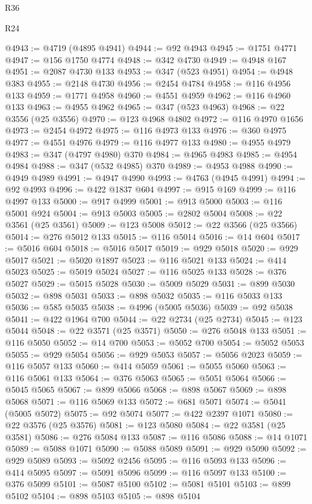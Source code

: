 \begin{lexlean}{R36}
\begin{lexlean}{R24}
\begin{coremodule}
{{{{{{{{{{{{{{{{{{{{{{{{{{{{{{{{{{{{{{{{{{{{{{{{{{{{{{{{{{{{{{{{{{{{{{{{{{{{{{{{{{{{{{{{{{{{{{{{{{{{{{{{{{{{{{{{{{{{{{{{{{{{{{{{{{{{{{{{{{{{{{{{{{{{{{{{{{{{{{{{{{{{{{{{{{{{{{{{{{{{{{{{{{{{{{{{{{{@4943 := @4719 (@4895 @4941)
@4944 := @92 @4943
@4945 := @1751 @4771
@4947 := @156 @1750 @4774
@4948 := @342 @4730
@4949 := @4948 @167
@4951 := @2087 @4730 @133
@4953 := @347 (@523 @4951)
@4954 := @4948 @383
@4955 := @2148 @4730
@4956 := @2454 @4784
@4958 := @116 @4956 @133
@4959 := @1771 @4958
@4960 := @4551 @4959
@4962 := @116 @4960 @133
@4963 := @4955 @4962
@4965 := @347 (@523 @4963)
@4968 := @22 @3556 (@25 @3556)
@4970 := @123 @4968 @4802
@4972 := @116 @4970 @1656
@4973 := @2454 @4972
@4975 := @116 @4973 @133
@4976 := @360 @4975
@4977 := @4551 @4976
@4979 := @116 @4977 @133
@4980 := @4955 @4979
@4983 := @347 (@4797 @4980) @370
@4984 := @4965 @4983
@4985 := @4954 @4984
@4988 := @347 (@532 @4985) @370
@4989 := @4953 @4988
@4990 := @4949 @4989
@4991 := @4947 @4990
@4993 := @4763 (@4945 @4991)
@4994 := @92 @4993
@4996 := @422 @1837 @604
@4997 := @915 @169
@4999 := @116 @4997 @133
@5000 := @917 @4999
@5001 := @913 @5000
@5003 := @116 @5001 @924
@5004 := @913 @5003
@5005 := @2802 @5004
@5008 := @22 @3561 (@25 @3561)
@5009 := @123 @5008
@5012 := @22 @3566 (@25 @3566)
@5014 := @276 @5012 @133
@5015 := @116 @5014
@5016 := @14 @604
@5017 := @5016 @604
@5018 := @5016 @5017
@5019 := @929 @5018
@5020 := @929 @5017
@5021 := @5020 @1897
@5023 := @116 @5021 @133
@5024 := @414 @5023
@5025 := @5019 @5024
@5027 := @116 @5025 @133
@5028 := @376 @5027
@5029 := @5015 @5028
@5030 := @5009 @5029
@5031 := @899 @5030
@5032 := @898 @5031
@5033 := @898 @5032
@5035 := @116 @5033 @133
@5036 := @585 @5035
@5038 := @4996 (@5005 @5036)
@5039 := @92 @5038
@5041 := @422 @1964 @700
@5044 := @22 @2734 (@25 @2734)
@5045 := @123 @5044
@5048 := @22 @3571 (@25 @3571)
@5050 := @276 @5048 @133
@5051 := @116 @5050
@5052 := @14 @700
@5053 := @5052 @700
@5054 := @5052 @5053
@5055 := @929 @5054
@5056 := @929 @5053
@5057 := @5056 @2023
@5059 := @116 @5057 @133
@5060 := @414 @5059
@5061 := @5055 @5060
@5063 := @116 @5061 @133
@5064 := @376 @5063
@5065 := @5051 @5064
@5066 := @5045 @5065
@5067 := @899 @5066
@5068 := @898 @5067
@5069 := @898 @5068
@5071 := @116 @5069 @133
@5072 := @681 @5071
@5074 := @5041 (@5005 @5072)
@5075 := @92 @5074
@5077 := @422 @2397 @1071
@5080 := @22 @3576 (@25 @3576)
@5081 := @123 @5080
@5084 := @22 @3581 (@25 @3581)
@5086 := @276 @5084 @133
@5087 := @116 @5086
@5088 := @14 @1071
@5089 := @5088 @1071
@5090 := @5088 @5089
@5091 := @929 @5090
@5092 := @929 @5089
@5093 := @5092 @2456
@5095 := @116 @5093 @133
@5096 := @414 @5095
@5097 := @5091 @5096
@5099 := @116 @5097 @133
@5100 := @376 @5099
@5101 := @5087 @5100
@5102 := @5081 @5101
@5103 := @899 @5102
@5104 := @898 @5103
@5105 := @898 @5104
}}}}}}}}}}}}}}}}}}}}}}}}}}}}}}}}}}}}}}}}}}}}}}}}}}}}}}}}}}}}}}}}}}}}}}}}}}}}}}}}}}}}}}}}}}}}}}}}}}}}}}}}}}}}}}}}}}}}}}}}}}}}}}}}}}}}}}}}}}}}}}}}}}}}}}}}}}}}}}}}}}}}}}}}}}}}}}}}}}}}}}}}}}}}}}}}}}}
\end{coremodule}
\end{lexlean}
\end{lexlean}
